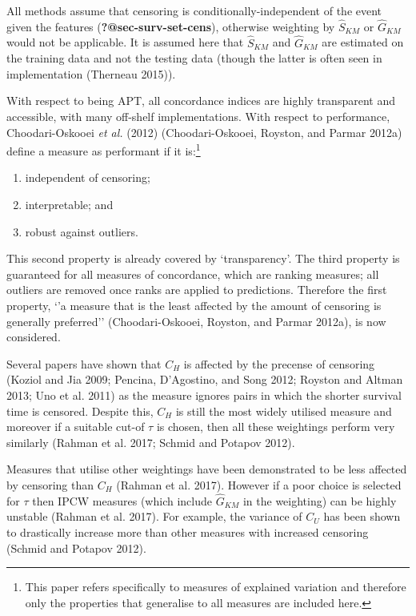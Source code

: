 \documentclass[
  letterpaper,
]{scrbook}
\providecommand{\tightlist}{%
  \setlength{\itemsep}{0pt}\setlength{\parskip}{0pt}}\usepackage{longtable,booktabs,array}
\theoremstyle{plain}
\theoremstyle{definition}
\theoremstyle{remark}
\begin{document}
All methods assume that censoring is conditionally-independent of the
event given the features (\textbf{?@sec-surv-set-cens}), otherwise
weighting by \(\hat{S}_{KM}\) or \(\hat{G}_{KM}\) would not be
applicable. It is assumed here that \(\hat{S}_{KM}\) and
\(\hat{G}_{KM}\) are estimated on the training data and not the testing
data (though the latter is often seen in implementation (Therneau
2015)).

With respect to being APT, all concordance indices are highly
transparent and accessible, with many off-shelf implementations. With
respect to performance, Choodari-Oskooei \textit{et al.} (2012)
(Choodari-Oskooei, Royston, and Parmar 2012a) define a measure as
performant if it is:\footnote{This paper refers specifically to measures
  of explained variation and therefore only the properties that
  generalise to all measures are included here.}

\begin{enumerate}
\def\labelenumi{\roman{enumi}.}
\tightlist
\item
  independent of censoring;
\item
  interpretable; and
\item
  robust against outliers.
\end{enumerate}

This second property is already covered by `transparency'. The third
property is guaranteed for all measures of concordance, which are
ranking measures; all outliers are removed once ranks are applied to
predictions. Therefore the first property, `'a measure that is the least
affected by the amount of censoring is generally preferred''
(Choodari-Oskooei, Royston, and Parmar 2012a), is now considered.

Several papers have shown that \(C_H\) is affected by the precense of
censoring (Koziol and Jia 2009; Pencina, D'Agostino, and Song 2012;
Royston and Altman 2013; Uno et al. 2011) as the measure ignores pairs
in which the shorter survival time is censored. Despite this, \(C_H\) is
still the most widely utilised measure and moreover if a suitable cut-of
\(\tau\) is chosen, then all these weightings perform very similarly
(Rahman et al. 2017; Schmid and Potapov 2012).

Measures that utilise other weightings have been demonstrated to be less
affected by censoring than \(C_H\) (Rahman et al. 2017). However if a
poor choice is selected for \(\tau\) then IPCW measures (which include
\(\hat{G}_{KM}\) in the weighting) can be highly unstable (Rahman et al.
2017). For example, the variance of \(C_U\) has been shown to
drastically increase more than other measures with increased censoring
(Schmid and Potapov 2012).
\end{document}
